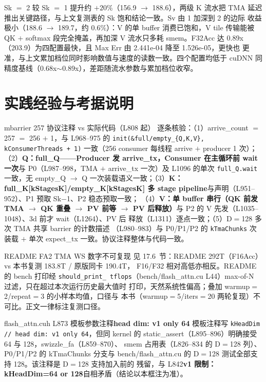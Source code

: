 Sk $=$ 2 较 Sk $=$ 1 提升约 $+20\%$（156.9 $\to$ 188.6），两级 K 流水把 TMA
延迟推出关键路径，与上文复测表的 Sk 饱和结论一致。Sv 由 1 加深到 2 的边际
收益极小（188.6 $\to$ 189.7，约 $0.6\%$）：V 的单 buffer 消费已饱和，V tile
传输能被 QK $+$ softmax 段完全掩盖，再加深 V 流水只多耗 smem。F32Acc 达
0.89x（203.9）为四配置最快，且 Max Err 由 2.441e-04 降至 1.526e-05，更快也
更准，与上文累加档位同时影响数值与速度的读数一致。四个配置均低于 cuDNN
同精度基线（0.68x$\sim$0.89x），差距随流水参数与累加档位收窄。

\section{实践经验与考据说明}

\begin{kaogu}[F2/F3 核校通过]{mbarrier 257 协议注释 vs 实际代码（L808 起）}
  逐条核验：（1）arrive\_count $=$ 257 $=$ 256 $+$ 1，与 L968--975 的
  \texttt{init\allowbreak{}(\&full/\allowbreak{}empty\_\allowbreak{}\{Q,\allowbreak{}K,\allowbreak{}V\},\allowbreak{} k\allowbreak{}Consumer\allowbreak{}Threads + 1)} 一致（256
  consumer 每线程 arrive $+$ producer 1 次）；（2）\textbf{Q：full\_Q——Producer
  发 arrive\_tx，Consumer 在主循环前 wait 一次}与 P0（L987--998，TMA $+$
  arrive\_tx 一次）及 L1096 的单次 \texttt{full\_Q.wait} 一致，无 empty\_Q
  $\to$ Q 一次装载语义一致；（3）\textbf{K：full\_K[kStagesK]/empty\_K[kStagesK]
  多 stage pipeline}与声明（L951--952）、P1 预取 Sk$-$1、P2 稳态预取一致；
  （4）\textbf{V：单 buffer 串行（QK 前发 TMA $\to$ QK 重叠 $\to$ PV 前等 $\to$
  PV 后释放）}与 P2 的 V 先发（L1035--1048）、3d 前才 wait（L1264）、PV 后
  释放（L1311）逐点一致；（5）D$=$128 多次 TMA 共享 barrier 的计数描述
  （L980--983）与 P0/P1/P2 的 \texttt{kTmaChunks} 次装载 $+$ 单次
  expect\_tx 一致。协议注释整体与代码一致。
\end{kaogu}

\begin{kaogu}[F4·口径差异]{README FA2 TMA WS 数字不可复现}
  见 17.6~节：README 292T（F16Acc）vs 本书复测 183.8T / 原版同卡 190.4T，
  F16/F32 相对高低亦相反。README 的 bench 打印经 \texttt{should\_\allowbreak{}print\_\allowbreak{}
  tflops}（bench/flash\_attn.cu L44）max-of-N 过滤，只在超过本次运行历史最大值时
  打印，天然系统性偏高；叠加 warmup$=$2/repeat$=$3 的小样本均值，口径与
  本书（warmup$=$5/iters$=$20 两轮复现）不可比。正文一律标注复测口径。
\end{kaogu}

\begin{kaogu}[F1·注释过时]{flash\_attn.cuh L873 模板参数注释\textbf{head dim: v1 only 64}}
  模板注释写 \texttt{kHeadDim // head dim: v1 only 64}，但同 kernel 的
  static\_assert（L895--896）明确接受 64 与 128，swizzle\_fa（L859--870）、
  smem 占用表（L826--834 的 D$=$128 列）、P0/P1/P2 的 kTmaChunks 分支与
  bench/flash\_attn.cu 的 D$=$128 测试全部支持 128。该注释是 D$=$128 支持加入前的
  残留，与 L842\textbf{v1 限制：kHeadDim=64 or 128}自相矛盾（结论以本框注为准）。
\end{kaogu}

